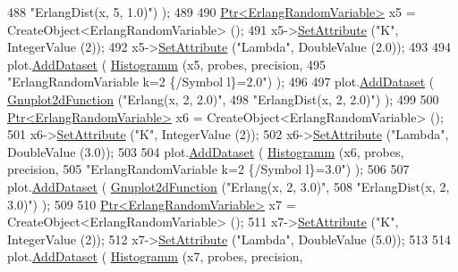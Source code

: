 \begin{DoxyCode}
488                                          \textcolor{stringliteral}{"ErlangDist(x, 5, 1.0)"}) );
489 
490     \hyperlink{classns3_1_1Ptr}{Ptr<ErlangRandomVariable>} x5 = CreateObject<ErlangRandomVariable> ();
491     x5->\hyperlink{classns3_1_1ObjectBase_ac60245d3ea4123bbc9b1d391f1f6592f}{SetAttribute} (\textcolor{stringliteral}{"K"}, IntegerValue (2));
492     x5->\hyperlink{classns3_1_1ObjectBase_ac60245d3ea4123bbc9b1d391f1f6592f}{SetAttribute} (\textcolor{stringliteral}{"Lambda"}, DoubleValue (2.0));
493 
494     plot.\hyperlink{classns3_1_1Gnuplot_a306ec724a327cf9ab699700f31fca0a1}{AddDataset} ( \hyperlink{main-random-variable_8cc_a2cfd3837ab3f2e816cf53486d7a186b5}{Histogramm} (x5, probes, precision,
495                                   \textcolor{stringliteral}{"ErlangRandomVariable k=2 \{/Symbol l\}=2.0"}) );
496 
497     plot.\hyperlink{classns3_1_1Gnuplot_a306ec724a327cf9ab699700f31fca0a1}{AddDataset} ( \hyperlink{classns3_1_1Gnuplot2dFunction}{Gnuplot2dFunction} (\textcolor{stringliteral}{"Erlang(x, 2, 2.0)"},
498                                          \textcolor{stringliteral}{"ErlangDist(x, 2, 2.0)"}) );
499 
500     \hyperlink{classns3_1_1Ptr}{Ptr<ErlangRandomVariable>} x6 = CreateObject<ErlangRandomVariable> ();
501     x6->\hyperlink{classns3_1_1ObjectBase_ac60245d3ea4123bbc9b1d391f1f6592f}{SetAttribute} (\textcolor{stringliteral}{"K"}, IntegerValue (2));
502     x6->\hyperlink{classns3_1_1ObjectBase_ac60245d3ea4123bbc9b1d391f1f6592f}{SetAttribute} (\textcolor{stringliteral}{"Lambda"}, DoubleValue (3.0));
503 
504     plot.\hyperlink{classns3_1_1Gnuplot_a306ec724a327cf9ab699700f31fca0a1}{AddDataset} ( \hyperlink{main-random-variable_8cc_a2cfd3837ab3f2e816cf53486d7a186b5}{Histogramm} (x6, probes, precision,
505                                   \textcolor{stringliteral}{"ErlangRandomVariable k=2 \{/Symbol l\}=3.0"}) );
506 
507     plot.\hyperlink{classns3_1_1Gnuplot_a306ec724a327cf9ab699700f31fca0a1}{AddDataset} ( \hyperlink{classns3_1_1Gnuplot2dFunction}{Gnuplot2dFunction} (\textcolor{stringliteral}{"Erlang(x, 2, 3.0)"},
508                                          \textcolor{stringliteral}{"ErlangDist(x, 2, 3.0)"}) );
509 
510     \hyperlink{classns3_1_1Ptr}{Ptr<ErlangRandomVariable>} x7 = CreateObject<ErlangRandomVariable> ();
511     x7->\hyperlink{classns3_1_1ObjectBase_ac60245d3ea4123bbc9b1d391f1f6592f}{SetAttribute} (\textcolor{stringliteral}{"K"}, IntegerValue (2));
512     x7->\hyperlink{classns3_1_1ObjectBase_ac60245d3ea4123bbc9b1d391f1f6592f}{SetAttribute} (\textcolor{stringliteral}{"Lambda"}, DoubleValue (5.0));
513 
514     plot.\hyperlink{classns3_1_1Gnuplot_a306ec724a327cf9ab699700f31fca0a1}{AddDataset} ( \hyperlink{main-random-variable_8cc_a2cfd3837ab3f2e816cf53486d7a186b5}{Histogramm} (x7, probes, precision,

\end{DoxyCode}
